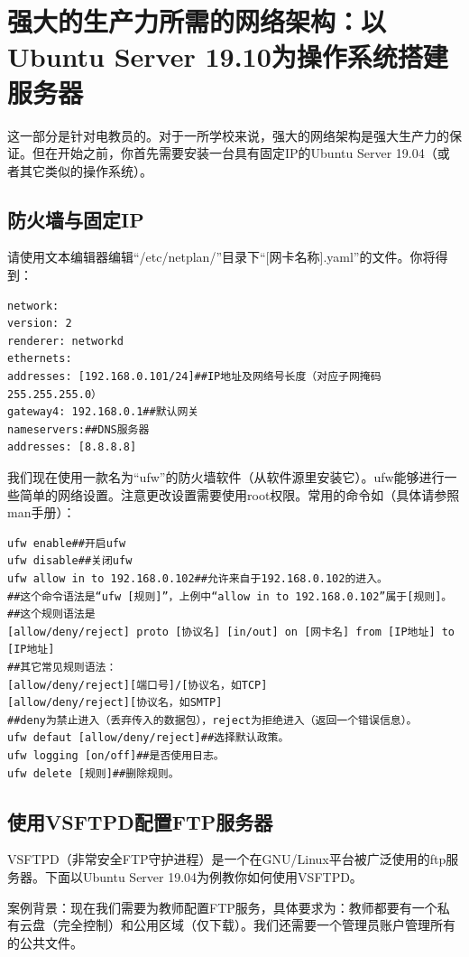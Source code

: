 \section{强大的生产力所需的网络架构：以Ubuntu Server 19.10为操作系统搭建服务器}
这一部分是针对电教员的。对于一所学校来说，强大的网络架构是强大生产力的保证。但在开始之前，你首先需要安装一台具有固定IP的Ubuntu Server 19.04（或者其它类似的操作系统）。
\subsection{防火墙与固定IP}
请使用文本编辑器编辑“/etc/netplan/”目录下“[网卡名称].yaml”的文件。你将得到：
\begin{verbatim}
network:
version: 2
renderer: networkd
ethernets:
addresses: [192.168.0.101/24]##IP地址及网络号长度（对应子网掩码255.255.255.0）
gateway4: 192.168.0.1##默认网关
nameservers:##DNS服务器
addresses: [8.8.8.8]
\end{verbatim}\par
我们现在使用一款名为“ufw”的防火墙软件（从软件源里安装它）。ufw能够进行一些简单的网络设置。注意更改设置需要使用root权限。常用的命令如（具体请参照man手册）：
\begin{verbatim}
ufw enable##开启ufw
ufw disable##关闭ufw
ufw allow in to 192.168.0.102##允许来自于192.168.0.102的进入。
##这个命令语法是“ufw [规则]”，上例中“allow in to 192.168.0.102”属于[规则]。
##这个规则语法是
[allow/deny/reject] proto [协议名] [in/out] on [网卡名] from [IP地址] to [IP地址]
##其它常见规则语法：
[allow/deny/reject][端口号]/[协议名，如TCP]
[allow/deny/reject][协议名，如SMTP]
##deny为禁止进入（丢弃传入的数据包），reject为拒绝进入（返回一个错误信息）。
ufw defaut [allow/deny/reject]##选择默认政策。
ufw logging [on/off]##是否使用日志。
ufw delete [规则]##删除规则。
\end{verbatim}
\subsection{使用VSFTPD配置FTP服务器}
VSFTPD（非常安全FTP守护进程）是一个在GNU/Linux平台被广泛使用的ftp服务器。下面以Ubuntu Server 19.04为例教你如何使用VSFTPD。\par
案例背景：现在我们需要为教师配置FTP服务，具体要求为：教师都要有一个私有云盘（完全控制）和公用区域（仅下载）。我们还需要一个管理员账户管理所有的公共文件。
